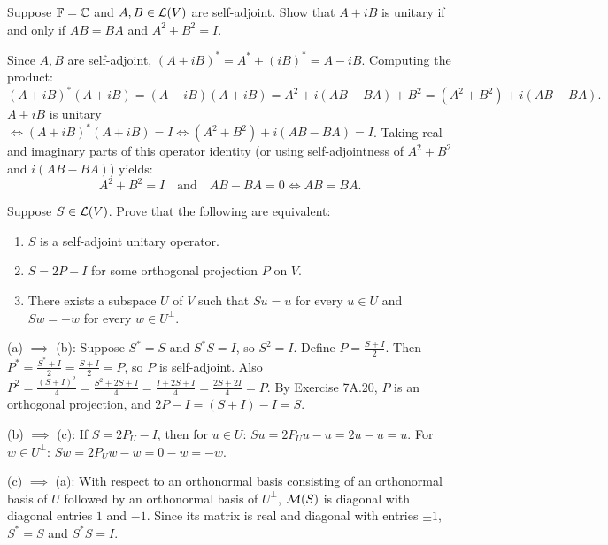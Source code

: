 \begin{xrcs}
  Suppose $\mathbb{F} = \mathbb{C}$ and $A, B \in \mathcal{L}(V)$ are self-adjoint. Show that $A + iB$ is unitary if and only if $AB = BA$ and $A^2 + B^2 = I$.

\begin{xprf}
  Since $A, B$ are self-adjoint, $(A + iB)^* = A^* + (iB)^* = A - iB$.
  Computing the product:
  \[
    (A + iB)^*(A + iB) = (A - iB)(A + iB) = A^2 + i(AB - BA) + B^2 = (A^2 + B^2) + i(AB - BA).
  \]
  $A+iB$ is unitary $\iff (A+iB)^*(A+iB) = I \iff (A^2 + B^2) + i(AB - BA) = I$.
  Taking real and imaginary parts of this operator identity (or using self-adjointness of $A^2+B^2$ and $i(AB-BA)$) yields:
  \[
    A^2 + B^2 = I \quad \text{and} \quad AB - BA = 0 \iff AB = BA.
  \]
\end{xprf}
\end{xrcs}

\begin{xrcs}
  Suppose $S \in \mathcal{L}(V)$. Prove that the following are equivalent:
  \begin{enumerate}[label=\textbf{(\alph*)}]
    \item $S$ is a self-adjoint unitary operator.
    \item $S = 2P - I$ for some orthogonal projection $P$ on $V$.
    \item There exists a subspace $U$ of $V$ such that $Su = u$ for every $u \in U$ and $Sw = -w$ for every $w \in U^\perp$.
  \end{enumerate}

\begin{xprf}
  (a) $\implies$ (b): Suppose $S^* = S$ and $S^*S = I$, so $S^2 = I$.
  Define $P = \frac{S + I}{2}$. Then $P^* = \frac{S^* + I}{2} = \frac{S+I}{2} = P$, so $P$ is self-adjoint.
  Also $P^2 = \frac{(S+I)^2}{4} = \frac{S^2 + 2S + I}{4} = \frac{I + 2S + I}{4} = \frac{2S+2I}{4} = P$.
  By Exercise 7A.20, $P$ is an orthogonal projection, and $2P - I = (S+I) - I = S$.

  (b) $\implies$ (c): If $S = 2P_U - I$, then for $u \in U$: $Su = 2P_U u - u = 2u - u = u$.
  For $w \in U^\perp$: $Sw = 2P_U w - w = 0 - w = -w$.

  (c) $\implies$ (a): With respect to an orthonormal basis consisting of an orthonormal basis of $U$ followed by an orthonormal basis of $U^\perp$, $\mathcal{M}(S)$ is diagonal with diagonal entries $1$ and $-1$.
  Since its matrix is real and diagonal with entries $\pm 1$, $S^* = S$ and $S^*S = I$.
\end{xprf}
\end{xrcs}

